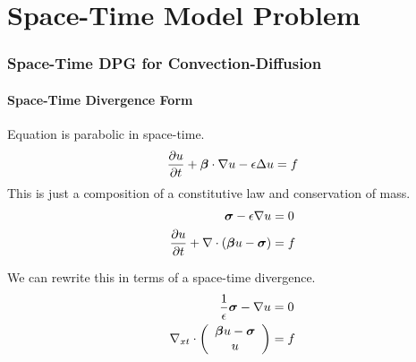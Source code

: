 \documentclass[18pt,xcolor=table]{beamer}
\begin{document}
\section{Space-Time Model Problem}
\begin{frame}[t]
\frametitle{Space-Time DPG for Convection-Diffusion}
\framesubtitle{Space-Time Divergence Form}
Equation is parabolic in space-time.
\[
\frac{\partial u}{\partial t}+\boldsymbol\beta\cdot\nabla u-\epsilon\Delta u=f
\]
This is just a composition of a constitutive law and conservation of mass.
\begin{align*}
\boldsymbol\sigma-\epsilon\nabla u&=0\\
\frac{\partial u}{\partial t}+\nabla\cdot\left( \boldsymbol\beta u-\boldsymbol\sigma \right)&=f
\end{align*}

We can rewrite this in terms of a space-time divergence.
\begin{align*}
\frac{1}{\epsilon}\boldsymbol\sigma-\nabla u &=0\\
\nabla_{xt}\cdot\left( \begin{array}{c} \boldsymbol\beta u-\boldsymbol\sigma\\ u\\ \end{array} \right)&=f
\end{align*}
\end{frame}
\end{document}
